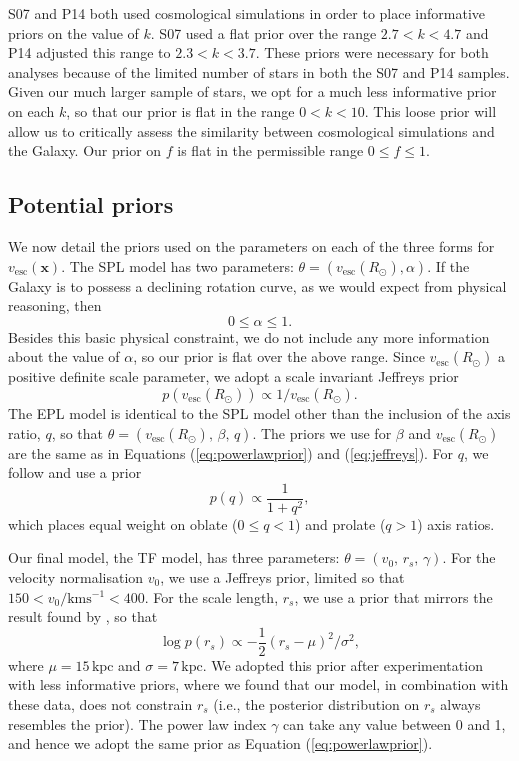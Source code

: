 \documentclass[useAMS,twocolumn,usenatbib]{mn2e}
\def\kpc{{\,\mathrm{kpc}}}
\def\vesc{{v_\mathrm{esc}}}
\def\pos{{\boldsymbol{x}}}
\begin{document}
S07 and P14 both used cosmological simulations in order to place
informative priors on the value of $k$. S07 used a flat prior over the
range $2.7 < k < 4.7$ and P14 adjusted this range to $2.3 < k <
3.7$. These priors were necessary for both analyses because of the
limited number of stars in both the S07 and P14 samples. Given our
much larger sample of stars, we opt for a much less informative prior
on each $k$, so that our prior is flat in the range $0 < k < 10$. This
loose prior will allow us to critically assess the similarity between
cosmological simulations and the Galaxy. Our prior on $f$ is flat in
the permissible range $0 \leq f \leq 1$.

\subsection{Potential priors}

We now detail the priors used on the parameters on each of the three
forms for $\vesc(\pos)$.  The SPL model has two parameters: $\theta =
(\vesc(R_\odot),\alpha)$. If the Galaxy is to possess a declining
rotation curve, as we would expect from physical reasoning, then
%
\begin{equation}
0 \leq \alpha \leq 1.
\label{eq:powerlawprior}
\end{equation}
%
Besides this basic physical constraint, we do not include any more
information about the value of $\alpha$, so our prior is flat over the
above range. Since $\vesc(R_\odot)$ a positive definite scale
parameter, we adopt a scale invariant Jeffreys prior
%
\begin{equation}
p\left(\vesc(R_\odot)\right) \propto 1/\vesc(R_\odot).
\label{eq:jeffreys}
\end{equation}
%
The EPL model is identical to the SPL model other than the inclusion
of the axis ratio, $q$, so that $\theta =
(\vesc(R_\odot),\,\beta,\,q)$. The priors we use for $\beta$ and
$\vesc(R_\odot)$ are the same as in Equations (\ref{eq:powerlawprior})
and (\ref{eq:jeffreys}). For $q$, we follow \citet{Bo16} and use a
prior
%
\begin{equation}
p(q) \propto \dfrac{1}{1+q^2},
\end{equation}
%
which places equal weight on oblate ($0\leq q <1$) and prolate ($q>1$)
axis ratios.

Our final model, the TF model, has three parameters: $\theta =
(v_0,\,r_s,\,\gamma)$. For the velocity normalisation $v_0$, we use a
Jeffreys prior, limited so that $150 < v_0/\mathrm{kms^{-1}} <
400$. For the scale length, $r_s$, we use a prior that mirrors the
result found by \citet{Gi14}, so that
%
\begin{equation}
\log p(r_s) \propto -\dfrac{1}{2}(r_s - \mu)^2 / \sigma^2,
\end{equation}
% 
where $\mu=15\kpc$ and $\sigma=7\kpc$. We adopted this prior after
experimentation with less informative priors, where we found that our
model, in combination with these data, does not constrain $r_s$ (i.e.,
the posterior distribution on $r_s$ always resembles the prior).  The
power law index $\gamma$ can take any value between 0 and 1, and hence
we adopt the same prior as Equation (\ref{eq:powerlawprior}).
\end{document}
